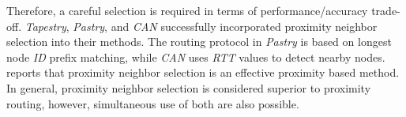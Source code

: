 Therefore, a careful selection is required in terms of
performance/accuracy trade-off. 
\emph{Tapestry}, \emph{Pastry}, and \emph{CAN} successfully incorporated
proximity neighbor selection into their methods. 
The routing protocol in \emph{Pastry} is based on longest node 
\emph{ID} prefix matching, while \emph{CAN} uses \emph{RTT} values to
detect nearby nodes. \cite{CDCR2002a} reports that proximity neighbor
selection is an effective proximity based method.
In general, proximity neighbor selection is considered 
superior to proximity routing, however, simultaneous use of both
are also possible.

%
%
%
%
%





